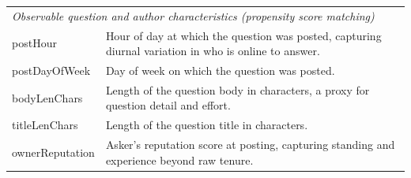\begin{table}
\begin{tabular}{p{4cm} p{9cm}}
\multicolumn{2}{l}{\textit{Observable question and author characteristics (propensity score matching)}}\\
postHour & Hour of day at which the question was posted, capturing diurnal variation in who is online to answer. \\
postDayOfWeek & Day of week on which the question was posted. \\
bodyLenChars & Length of the question body in characters, a proxy for question detail and effort. \\
titleLenChars & Length of the question title in characters. \\
ownerReputation & Asker's reputation score at posting, capturing standing and experience beyond raw tenure. \\
\bottomrule
\end{tabular}
\end{table}

